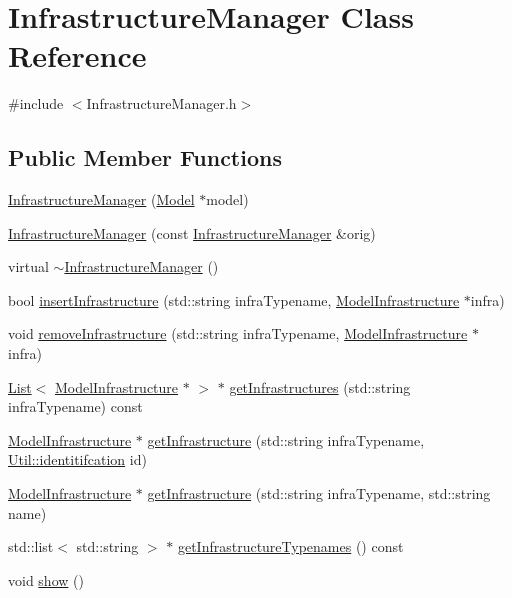 \hypertarget{class_infrastructure_manager}{\section{Infrastructure\-Manager Class Reference}
\label{class_infrastructure_manager}
}


{\ttfamily \#include $<$Infrastructure\-Manager.\-h$>$}

\subsection*{Public Member Functions}
\begin{DoxyCompactItemize}
\item 
\hyperlink{class_infrastructure_manager_a65067e32d70b63c7b0b46c61dcab6a22}{Infrastructure\-Manager} (\hyperlink{class_model}{Model} $\ast$model)
\item 
\hyperlink{class_infrastructure_manager_a091a712dc18339f9ea350519af229dba}{Infrastructure\-Manager} (const \hyperlink{class_infrastructure_manager}{Infrastructure\-Manager} \&orig)
\item 
virtual \hyperlink{class_infrastructure_manager_a5bca34aaf33a39c649ad3a1a9cd0ebf9}{$\sim$\-Infrastructure\-Manager} ()
\item 
bool \hyperlink{class_infrastructure_manager_a597f2262dee783093e616e3d8894690a}{insert\-Infrastructure} (std\-::string infra\-Typename, \hyperlink{class_model_infrastructure}{Model\-Infrastructure} $\ast$infra)
\item 
void \hyperlink{class_infrastructure_manager_a55ea1a348ec52d4ed1de3addf86b6d42}{remove\-Infrastructure} (std\-::string infra\-Typename, \hyperlink{class_model_infrastructure}{Model\-Infrastructure} $\ast$infra)
\item 
\hyperlink{class_list}{List}$<$ \hyperlink{class_model_infrastructure}{Model\-Infrastructure} $\ast$ $>$ $\ast$ \hyperlink{class_infrastructure_manager_a1d013b55994e27cac0c45c1ad08f74e0}{get\-Infrastructures} (std\-::string infra\-Typename) const 
\item 
\hyperlink{class_model_infrastructure}{Model\-Infrastructure} $\ast$ \hyperlink{class_infrastructure_manager_a2c957eee5107d521e8292cb6f8e9ea5b}{get\-Infrastructure} (std\-::string infra\-Typename, \hyperlink{class_util_ad17d458d9344b10bba64347e514d6d71}{Util\-::identitifcation} id)
\item 
\hyperlink{class_model_infrastructure}{Model\-Infrastructure} $\ast$ \hyperlink{class_infrastructure_manager_ab8663cae44cd58387391c1821c48beb7}{get\-Infrastructure} (std\-::string infra\-Typename, std\-::string name)
\item 
std\-::list$<$ std\-::string $>$ $\ast$ \hyperlink{class_infrastructure_manager_aaf3ff8d9288b333d21a202caae797bc7}{get\-Infrastructure\-Typenames} () const 
\item 
void \hyperlink{class_infrastructure_manager_a8e10fe1a6a40ce020b1b63232dbb05cd}{show} ()
\end{DoxyCompactItemize}


